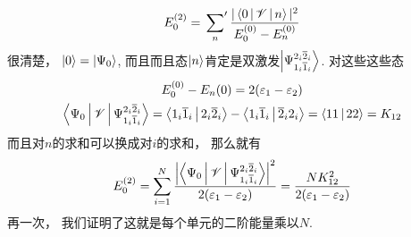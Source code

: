 \begin{align}
E_0^{(2)} = \sideset{}{'}\sum_n \frac{|\Braket{0|\mathscr{V}|n}|^2}{E_0^{(0)}-E_n^{(0)}}
\end{align}
很清楚，
$\Ket{0}=\Ket{\Psi_0}$,
而且而且态$\Ket{n}$肯定是双激发$\Ket{\Psi_{1_i\overline{1}_i}^{2_i\overline{2}_i}}$. 
对这些这些态
\begin{subequations}
	\begin{gather}
	E_0^{(0)} - E_n{(0)} = 2(\varepsilon_1 - \varepsilon_2)
	\label{6.83a}\\
	\Braket{\Psi_0|\mathscr{V}|\Psi_{1_i\overline{1}_i}^{2_i\overline{2}_i}} = \Braket{1_i\overline{1}_i | 2_i\overline{2}_i} - \Braket{1_i\overline{1}_i|\overline{2}_i2_i} = \Braket{11|22}=K_{12}
	\label{6.83b}
\end{gather}
\end{subequations}
而且对$n$的求和可以换成对$i$的求和，
那么就有
\begin{align}
E_0^{(2)} = \sum_{i=1}^{N} \frac{\left|\Braket{\Psi_0|\mathscr{V}|\Psi_{1_i\overline{1}_i}^{2_i\overline{2}_i}}\right|^2}{2(\varepsilon_1-\varepsilon_2)} = \frac{NK_{12}^2}{2(\varepsilon_1-\varepsilon_2)}
\end{align}
再一次，
我们证明了这就是每个单元的二阶能量乘以$N$.


